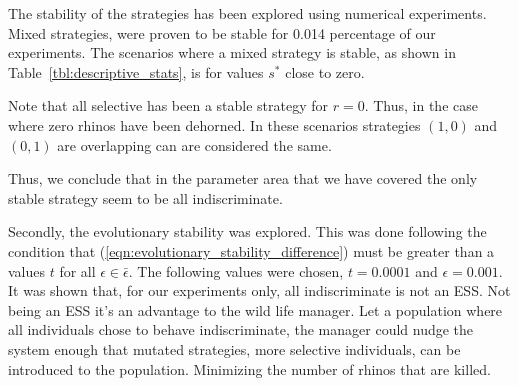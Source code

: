 \documentclass[10pt]{article}
\begin{document}
The stability of the strategies has been explored using numerical experiments. 
Mixed strategies, were proven to be stable for 0.014 percentage of our
experiments. The scenarios where a mixed strategy is stable, as shown in 
Table~\ref{tbl:descriptive_stats}, is for values \(s^*\)  close to zero.

Note that all selective has been a stable strategy for \(r=0\). Thus, in the case
where zero rhinos have been dehorned. In these scenarios strategies \((1, 0)\) and
\((0, 1)\) are overlapping can are considered the same.

Thus, we conclude that in the parameter area that we have covered the only stable
strategy seem to be all indiscriminate. 

Secondly, the evolutionary stability was explored. This was done following the condition that 
(\ref{eqn:evolutionary_stability_difference}) must be greater than a values \(t\) for all \(\epsilon
\in \bar{\epsilon}\). The following values were chosen, \(t=0.0001\) and \(\epsilon=0.001\). 
It was shown that, for our experiments only, all indiscriminate is not an ESS. Not being an ESS
it's an advantage to the wild life manager. Let a population where all individuals chose to behave
indiscriminate, the manager could nudge the system enough that mutated strategies, more
selective individuals, can be introduced to the population. Minimizing the number of rhinos
that are killed.


\end{document}
